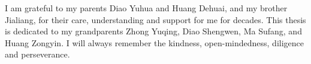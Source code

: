 \documentclass[
11pt, %
ngerman,
english, %
singlespacing, %
headsepline, %
]{MastersDoctoralThesis} %
\begin{document}
\begin{acknowledgements}
%
I am grateful to my parents Diao Yuhua and Huang Dehuai, and my brother Jialiang, for their care, 
understanding and support for me for decades. 
This thesis is dedicated to my grandparents Zhong Yuqing, Diao Shengwen, Ma Sufang, and Huang Zongyin. 
I will always remember the kindness, open-mindedness, diligence and perseverance.

\end{acknowledgements}

{
\hypersetup{linkcolor=black}
\tableofcontents %
}

{
\hypersetup{linkcolor=black}
\listoffigures %
}

{
\hypersetup{linkcolor=black}
\listoftables %
}

\end{document}
